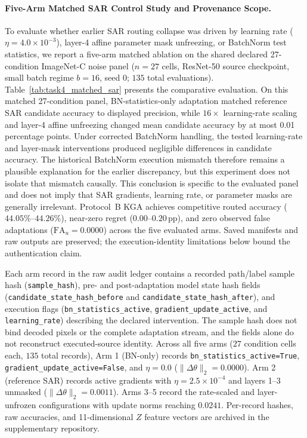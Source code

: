 \paragraph{Five-Arm Matched SAR Control Study and Provenance Scope.}
To evaluate whether earlier SAR routing collapse was driven by learning rate ($\eta = 4.0\times 10^{-3}$), layer-4 affine parameter mask unfreezing, or BatchNorm test statistics, we report a five-arm matched ablation on the shared declared 27-condition ImageNet-C noise panel ($n=27$ cells, ResNet-50 source checkpoint, small batch regime $b=16$, seed 0; $135$ total evaluations). Table~\ref{tab:task4_matched_sar} presents the comparative evaluation. On this matched 27-condition panel, BN-statistics-only adaptation matched reference SAR candidate accuracy to displayed precision, while $16\times$ learning-rate scaling and layer-4 affine unfreezing changed mean candidate accuracy by at most 0.01 percentage points. Under corrected BatchNorm handling, the tested learning-rate and layer-mask interventions produced negligible differences in candidate accuracy. The historical BatchNorm execution mismatch therefore remains a plausible explanation for the earlier discrepancy, but this experiment does not isolate that mismatch causally. This conclusion is specific to the evaluated panel and does not imply that SAR gradients, learning rate, or parameter masks are generally irrelevant. Protocol~B KGA achieves competitive routed accuracy ($44.05\%$--$44.26\%$), near-zero regret ($0.00$--$0.20\,\text{pp}$), and zero observed false adaptations ($\mathrm{FA}_u = 0.0000$) across the five evaluated arms. Saved manifests and raw outputs are preserved; the execution-identity limitations below bound the authentication claim.

Each arm record in the raw audit ledger contains a recorded path/label sample hash (\texttt{sample\_hash}), pre- and post-adaptation model state hash fields (\texttt{candidate\_state\_hash\_before} and \texttt{candidate\_state\_hash\_after}), and execution flags (\texttt{bn\_statistics\_active}, \texttt{gradient\_update\_active}, and \texttt{learning\_rate}) describing the declared intervention. The sample hash does not bind decoded pixels or the complete adaptation stream, and the fields alone do not reconstruct executed-source identity. Across all five arms ($27$ condition cells each, $135$ total records), Arm 1 (BN-only) records \texttt{bn\_statistics\_active=True}, \texttt{gradient\_update\_active=False}, and $\eta = 0.0$ ($\|\Delta \theta\|_2 = 0.0000$). Arm 2 (reference SAR) records active gradients with $\eta = 2.5\times 10^{-4}$ and layers 1--3 unmasked ($\|\Delta \theta\|_2 = 0.0011$). Arms 3--5 record the rate-scaled and layer-unfrozen configurations with update norms reaching $0.0241$. Per-record hashes, raw accuracies, and 11-dimensional $Z$ feature vectors are archived in the supplementary repository.

